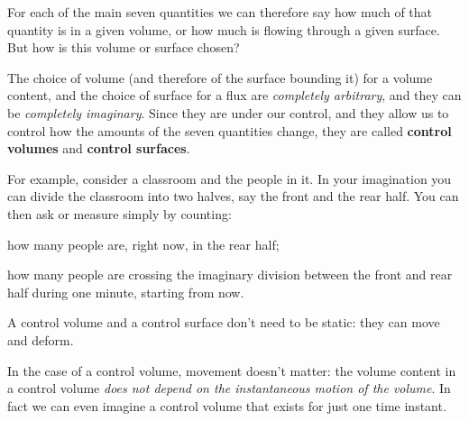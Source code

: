 \documentclass[a4paper,12pt,%
onecolumn,oneside,titlepage,%
british%
]{memoir}
\renewcommand*{\|}[1][]{\nonscript\:#1\vert\nonscript\:\mathopen{}}
\begin{document}
For each of the main seven quantities we can therefore say how much of that quantity is in a given volume, or how much is flowing through a given surface. But how is this volume or surface chosen?

The choice of volume (and therefore of the surface bounding it) for a volume content, and the choice of surface for a flux are \emph{completely arbitrary}, and they can be \emph{completely imaginary}. Since they are under our control, and they allow us to control how the amounts of the seven quantities change, they are called \textbf{control volumes} and \textbf{control surfaces}.

For example, consider a classroom and the people in it. In your imagination you can divide the classroom into two halves, say the front and the rear half. You can then ask or measure simply by counting:\enspace
\begin{enumerate*}[label=(\arabic*)]
\item how many people are, right now, in the rear half;\enspace
\item how many people are crossing the imaginary division between the front and rear half during one minute, starting from now.
\end{enumerate*}


\smallskip

A control volume and a control surface don't need to be static: they can move and deform.

In the case of a control volume, movement doesn't matter: the volume content in a control volume \emph{does not depend on the instantaneous motion of the volume}. In fact we can even imagine a control volume that exists for just one time instant.
\end{document}
